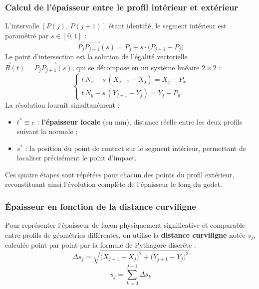\documentclass[14pt]{extarticle}
\begin{document}
\subsubsection{Calcul de l'épaisseur entre le profil intérieur et extérieur}
L'intervalle $[P(j),\,P(j+1)]$ étant identifié, le segment intérieur est
paramétré par $s \in [0,1]$ :
\[
    \overrightarrow{P_j P_{j+1}}(s) = P_j + s\cdot\bigl(P_{j+1} - P_j\bigr)
    \tag{7}
\]
Le point d'intersection est la solution de l'égalité vectorielle
$\vec{R}(t) = \overrightarrow{P_j P_{j+1}}(s)$,
qui se décompose en un système linéaire $2 \times 2$ :
\[
    \begin{cases}
        t\,N_x - s\,(X_{j+1}-X_j) = X_j - P_x \\[4pt]
        t\,N_y - s\,(Y_{j+1}-Y_j) = Y_j - P_y
    \end{cases}
    \tag{8}
\]
La résolution fournit simultanément :
\begin{itemize}
    \item $t^* \equiv e$ : \textbf{l'épaisseur locale} (en mm),
    distance réelle entre les deux profils suivant la normale ;
    \item $s^*$ : la position du point de contact sur le segment intérieur,
    permettant de localiser précisément le point d'impact.
\end{itemize}
Ces quatre étapes sont répétées pour chacun des points du profil extérieur,
reconstituant ainsi l'évolution complète de l'épaisseur le long du godet.

\subsubsection{Épaisseur en fonction de la distance curviligne}
Pour représenter l'épaisseur de façon physiquement significative et comparable
entre profils de géométries différentes, on utilise la \textbf{distance curviligne}
notée \(s_j\), calculée point par point par la formule de Pythagore discrète :
\[
    \Delta s_j = \sqrt{\bigl(X_{j+1} - X_j\bigr)^2 + \bigl(Y_{j+1} - Y_j\bigr)^2}
    \tag{9}
\]
\[
    s_j = \sum_{k=0}^{j-1} \Delta s_k
    \tag{10}
\]
\end{document}
